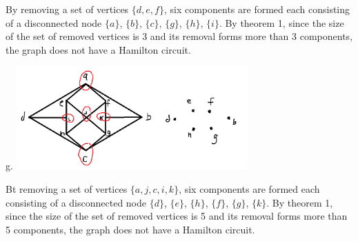 \documentclass{article}
\begin{document}
By removing a set of vertices $\{d,e,f\}$, six components are formed each consisting of a disconnected node $\{a\}$, $\{b\}$, $\{c\}$, $\{g\}$, $\{h\}$, $\{i\}$. By theorem 1, since the size of the set of removed vertices is 3 and its removal forms more than 3 components, the graph does not have a Hamilton circuit.

g. \newline{}\includegraphics[height=150px]{hw2bg.png}

Bt removing a set of vertices $\{a,j,c,i,k\}$, six components are formed each consisting of a disconnected node $\{d\}$, $\{e\}$, $\{h\}$, $\{f\}$, $\{g\}$, $\{k\}$. By theorem 1, since the size of the set of removed vertices is 5 and its removal forms more than 5 components, the graph does not have a Hamilton circuit.
\end{document}
